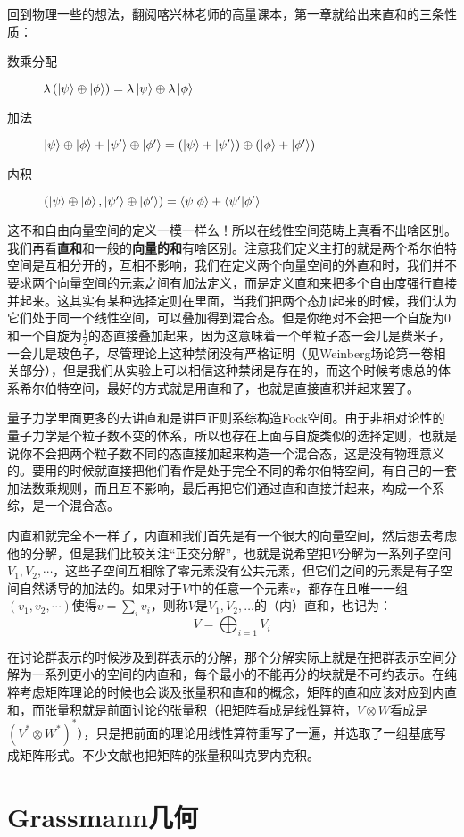 回到物理一些的想法，翻阅喀兴林老师的高量课本，第一章就给出来直和的三条性质：
\begin{description}
	\item[数乘分配]$\lambda \left(\ket{\psi}\oplus\ket{\phi}\right)=\lambda\ket{\psi}\oplus\lambda\ket{\phi}$
	\item[加法] $\ket{\psi}\oplus\ket{\phi}+\ket{\psi^\prime}\oplus\ket{\phi^\prime}=\left(\ket{\psi}+\ket{\psi^\prime}\right)\oplus\left(\ket{\phi}+\ket{\phi^\prime}\right)$
	\item[内积]$\left(\ket{\psi}\oplus\ket{\phi},\ket{\psi^\prime}\oplus\ket{\phi^\prime}\right)=\braket{\psi}{\phi}+\braket{\psi^\prime}{\phi^\prime}$
\end{description}
这不和自由向量空间的定义一模一样么！所以在线性空间范畴上真看不出啥区别。我们再看\textbf{直和}和一般的\textbf{向量的和}有啥区别。注意我们定义主打的就是两个希尔伯特空间是互相分开的，互相不影响，我们在定义两个向量空间的外直和时，我们并不要求两个向量空间的元素之间有加法定义，而是定义直和来把多个自由度强行直接并起来。这其实有某种选择定则在里面，当我们把两个态加起来的时候，我们认为它们处于同一个线性空间，可以叠加得到混合态。但是你绝对不会把一个自旋为0和一个自旋为$\frac12$的态直接叠加起来，因为这意味着一个单粒子态一会儿是费米子，一会儿是玻色子，尽管理论上这种禁闭没有严格证明（见Weinberg场论第一卷相关部分），但是我们从实验上可以相信这种禁闭是存在的，而这个时候考虑总的体系希尔伯特空间，最好的方式就是用直和了，也就是直接直积并起来罢了。

量子力学里面更多的去讲直和是讲巨正则系综构造Fock空间。由于非相对论性的量子力学是个粒子数不变的体系，所以也存在上面与自旋类似的选择定则，也就是说你不会把两个粒子数不同的态直接加起来构造一个混合态，这是没有物理意义的。要用的时候就直接把他们看作是处于完全不同的希尔伯特空间，有自己的一套加法数乘规则，而且互不影响，最后再把它们通过直和直接并起来，构成一个系综，是一个混合态。

内直和就完全不一样了，内直和我们首先是有一个很大的向量空间，然后想去考虑他的分解，但是我们比较关注“正交分解”，也就是说希望把$V$分解为一系列子空间$V_1,V_2,\cdots$，这些子空间互相除了零元素没有公共元素，但它们之间的元素是有子空间自然诱导的加法的。如果对于$V$中的任意一个元素$v$，都存在且唯一一组$(v_1,v_2,\cdots)$使得$v=\sum_i v_i$，则称$V$是$V_1,V_2,\ldots$的（内）直和，也记为：
\begin{equation}
	V=\bigoplus_{i=1} V_i
\end{equation}

在讨论群表示的时候涉及到群表示的分解，那个分解实际上就是在把群表示空间分解为一系列更小的空间的内直和，每个最小的不能再分的块就是不可约表示。在纯粹考虑矩阵理论的时候也会谈及张量积和直和的概念，矩阵的直和应该对应到内直和，而张量积就是前面讨论的张量积（把矩阵看成是线性算符，$V\otimes W$看成是$(V^*\otimes W^*)^*$），只是把前面的理论用线性算符重写了一遍，并选取了一组基底写成矩阵形式。不少文献也把矩阵的张量积叫克罗内克积。

\section{Grassmann几何}